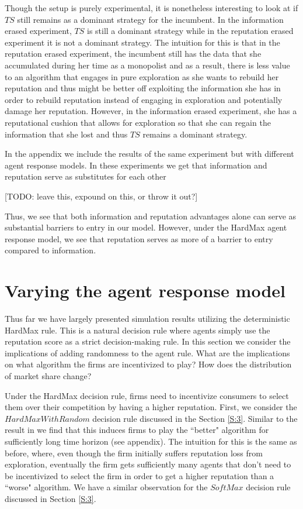 \documentclass{article}
\theoremstyle{definition}
\begin{document}
Though the setup is purely experimental, it is nonetheless interesting to look at if $TS$ still remains as a dominant strategy for the incumbent. In the information erased experiment, $TS$ is still a dominant strategy while in the reputation erased experiment it is not a dominant strategy. The intuition for this is that in the reputation erased experiment, the incumbent still has the data that she accumulated during her time as a monopolist and as a result, there is less value to an algorithm that engages in pure exploration as she wants to rebuild her reputation and thus might be better off exploiting the information she has in order to rebuild reputation instead of engaging in exploration and potentially damage her reputation. However, in the information erased experiment, she has a reputational cushion that allows for exploration so that she can regain the information that she lost and thus $TS$ remains a dominant strategy.

In the appendix we include the results of the same experiment but with different agent response models. In these experiments we get that information and reputation serve as substitutes for each other

[TODO: leave this, expound on this, or throw it out?]

Thus, we see that both information and reputation advantages alone can serve as substantial barriers to entry in our model. However, under the HardMax agent response model, we see that reputation serves as more of a barrier to entry compared to information.

\section{Varying the agent response model}
\label{S:9}

Thus far we have largely presented simulation results utilizing the deterministic HardMax rule. This is a natural decision rule where agents simply use the reputation score as a strict decision-making rule. In this section we consider the implications of adding randomness to the agent rule. What are the implications on what algorithm the firms are incentivized to play? How does the distribution of market share change?

Under the HardMax decision rule, firms need to incentivize consumers to select them over their competition by having a higher reputation. First, we consider the $HardMaxWithRandom$ decision rule discussed in the Section \ref{S:3}. Similar to the result in \citet{mansour2017competing} we find that this induces firms to play the ``better" algorithm for sufficiently long time horizon (see appendix). The intuition for this is the same as before, where, even though the firm initially suffers reputation loss from exploration, eventually the firm gets sufficiently many agents that don't need to be incentivized to select the firm in order to get a higher reputation than a ``worse" algorithm. We have a similar observation for the $SoftMax$ decision rule discussed in Section \ref{S:3}.
\end{document}
